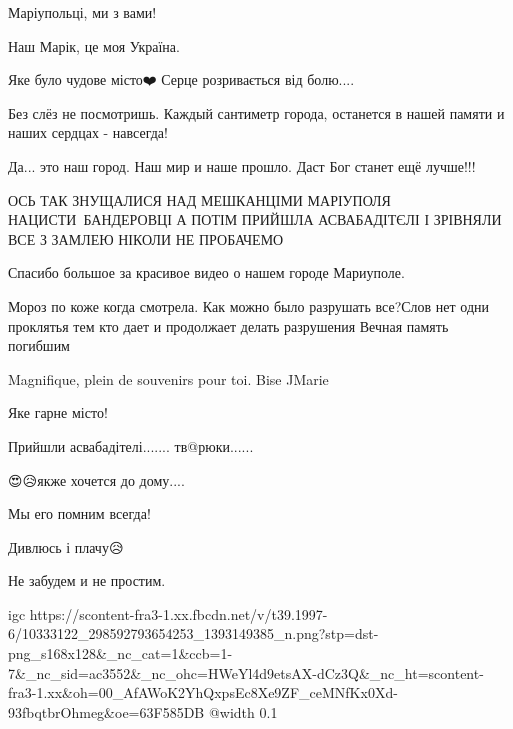 
Маріупольці, ми з вами!


Наш Марік, це моя Україна.


Яке було чудове місто❤️ Серце розривається від болю....


Без слёз не посмотришь. Каждый сантиметр города, останется в нашей памяти и
наших сердцах - навсегда!


Да... это наш город. Наш мир и наше прошло. Даст Бог станет ещё лучше!!!


ОСЬ ТАК ЗНУЩАЛИСЯ НАД МЕШКАНЦІМИ МАРІУПОЛЯ НАЦИСТИ~БАНДЕРОВЦІ
А ПОТІМ ПРИЙШЛА АСВАБАДІТЄЛІ І ЗРІВНЯЛИ ВСЕ З ЗАМЛЕЮ
НІКОЛИ НЕ ПРОБАЧЕМО


Спасибо большое за красивое видео о нашем городе Мариуполе.


Мороз по коже когда смотрела. Как можно было разрушать все?Слов нет одни
проклятья тем кто дает и продолжает делать разрушения Вечная память погибшим🥲


Magnifique, plein de souvenirs pour toi. Bise JMarie


Яке гарне місто!


Прийшли асвабадітелі....... тв@рюки......


😍😥якже хочется до дому....


Мы его помним всегда!


Дивлюсь і плачу😥🙏🇺🇦


Не забудем и не простим.

\ifcmt
  igc https://scontent-fra3-1.xx.fbcdn.net/v/t39.1997-6/10333122_298592793654253_1393149385_n.png?stp=dst-png_s168x128&_nc_cat=1&ccb=1-7&_nc_sid=ac3552&_nc_ohc=HWeYl4d9etsAX-dCz3Q&_nc_ht=scontent-fra3-1.xx&oh=00_AfAWoK2YhQxpsEc8Xe9ZF_ceMNfKx0Xd-93fbqtbrOhmeg&oe=63F585DB
	@width 0.1
\fi

